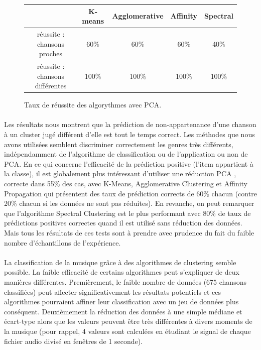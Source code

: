 \documentclass[soumission]{ir}
\begin{document}
\begin{figure}[ht]
    \centering
    \begin{tabular}{ccccc}
        \phantom & K-means & Agglomerative & Affinity & Spectral\\
        \hline
        réussite : chansons proches & 60\%& 60\% & 60\% & 40\%\\
        réussite : chansons différentes & 100\% & 100\% & 100\% & 100\%\\
        \hline
    \end{tabular}
    \caption{Taux de réussite des algorythmes avec PCA.}
\end{figure}

\paragraph{}
Les résultats nous montrent que la prédiction de non-appartenance d’une chanson à un cluster jugé différent d’elle
est tout le temps correct. Les méthodes que nous avons utilisées semblent discriminer correctement les genres très 
différents, indépendamment de l’algorithme de classification ou de l’application ou non de PCA. En ce qui 
concerne l'efficacité de la prédiction positive (l’item appartient à la classe), il est globalement plus 
intéressant d’utiliser une réduction PCA , correcte dans 55\% des cas, avec K-Means, Agglomerative Clustering et 
Affinity Propagation qui présentent des taux de prédiction corrects de 60\% chacun (contre 20\% chacun si les 
données ne sont pas réduites). En revanche, on peut remarquer que l’algorithme Spectral Clustering est le plus 
performant avec 80\% de taux de prédictions positives correctes quand il est utilisé sans réduction des données. 
Mais tous les résultats de ces tests sont à prendre avec prudence du fait du faible nombre d'échantillons de 
l’expérience.

\paragraph{}
La classification de la musique grâce à des algorithmes de clustering semble possible. La faible efficacité de 
certains algorithmes peut s’expliquer de deux manières différentes. Premièrement, le faible nombre de données 
(675 chansons classifiées) peut affecter significativement les résultats potentiels et ces algorithmes pourraient 
affiner leur classification avec un jeu de données plus conséquent. Deuxièmement la réduction des données à une 
simple médiane et écart-type alors que les valeurs peuvent être très différentes à divers moments de la musique 
(pour rappel, 4 valeurs sont calculées en étudiant le signal de chaque fichier audio divisé en fenêtres de 1 
seconde).
\end{document}
